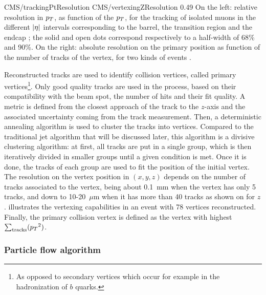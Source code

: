                      {CMS/trackingPtResolution}
                     {CMS/vertexingZResolution}
                     {0.49}
                     {On the left: relative resolution in $p_T$, as function of the $p_T$, for the
                     tracking of isolated muons in the different $\left| \eta \right|$ intervals corresponding
                     to the barrel,
                     the transition region and the endcap ; the solid and open dots correspond respectively
                     to a half-width of 68\% and 90\%. On the right: absolute resolution on the
                     primary position as function of the number of tracks of the vertex,
                     for two kinds of events \cite{CMStracking}.}

    Reconstructed tracks are used to identify collision vertices, called primary
    vertices\footnote{As opposed to secondary vertices which occur for example in the
    hadronization of $b$ quarks.}. Only good quality tracks are used in the process, based on their
    compatibility with the beam spot, the number of hits and their fit quality. A
    metric is defined from the closest approach of the track to the $z$-axis and
    the associated uncertainty coming from the track measurement. Then, a deterministic
    annealing algorithm \cite{DAclustering} is used to cluster the tracks into vertices. Compared to the
    traditional jet algorithm that will be discussed later, this algorithm is a divisive
    clustering algorithm: at first, all tracks are put in a single group, which is then
    iteratively divided in smaller groups until a given condition is met. Once it is
    done, the tracks of each group are used to fit the position of the initial vertex.
    The resolution on the vertex position in $(x,y,z)$ depends on the number of tracks
    associated to the vertex, being about 0.1~mm when the vertex has only 5 tracks, and
    down to 10-20~$\mu$m when it has more than 40 tracks as shown on  for $z$.
     illustrates the vertexing capabilities in an event with
    78 vertices reconstructed. Finally, the primary collision vertex is defined as the
    vertex with highest $\sum_\text{tracks} ({p_T}^2)$.


        \subsubsection{Particle flow algorithm}

